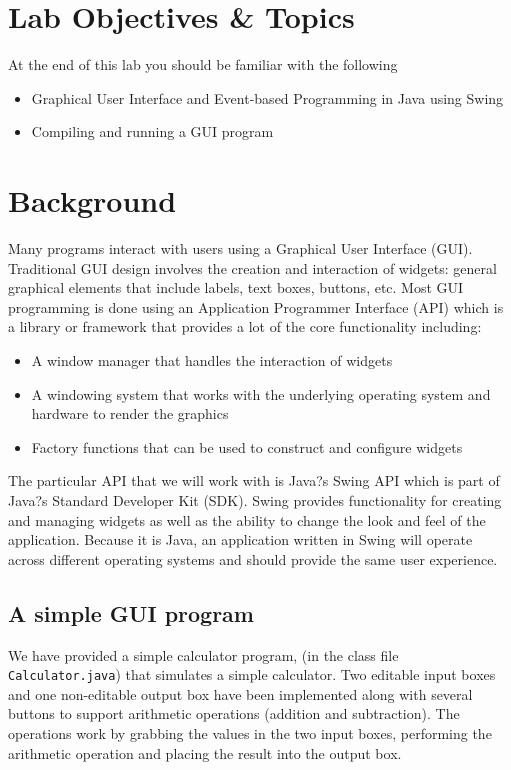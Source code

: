 \documentclass[12pt]{scrartcl}
\begin{document}
\section{Lab Objectives \& Topics}
At the end of this lab you should be familiar with the following
\begin{itemize}
  \item Graphical User Interface and Event-based Programming in Java using Swing
  \item Compiling and running a GUI program
\end{itemize}

\section{Background}

Many programs interact with users using a Graphical User 
Interface (GUI).  Traditional GUI design involves the creation 
and interaction of widgets: general graphical elements that 
include labels, text boxes, buttons, etc.  Most GUI programming 
is done using an Application Programmer Interface (API) 
which is a library or framework that provides a lot of the core 
functionality including:
\begin{itemize}
  \item A window manager that handles the interaction of widgets
  \item A windowing system that works with the underlying operating 
  	system and hardware to render the graphics
  \item Factory functions that can be used to construct and configure widgets
\end{itemize}
The particular API that we will work with is Java?s Swing API which 
is part of Java?s Standard Developer Kit (SDK).  Swing provides 
functionality for creating and managing widgets as well as the 
ability to change the look and feel of the application.  Because 
it is Java, an application written in Swing will operate across 
different operating systems and should provide the same user experience.

\subsection*{A simple GUI program}

We have provided a simple calculator program, (in the class file 
\texttt{Calculator.java}) that simulates a simple calculator.  
Two editable input boxes and one non-editable output box have 
been implemented along with several buttons to support arithmetic 
operations (addition and subtraction).  The operations work by 
grabbing the values in the two input boxes, performing the 
arithmetic operation and placing the result into the output box.
\end{document}
